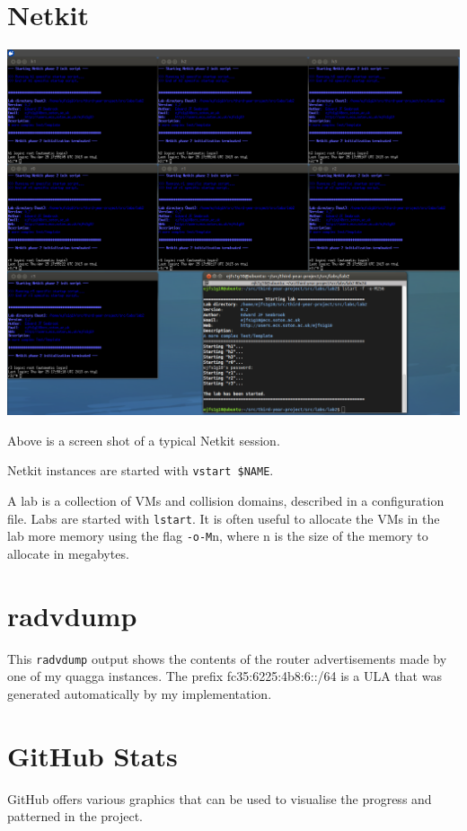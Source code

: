 \chapter{Netkit}
\begin{center}
	\includegraphics[width=\linewidth]{../Diagrams/Netkit/NetkitScreenshot.png}
\end{center}

Above is a screen shot of a typical Netkit session.  

Netkit instances are started with \texttt{vstart \$NAME}.

A lab is a collection of VMs and collision domains, described in a
configuration file. Labs are started with \texttt{lstart}. It is often useful
to allocate the VMs in the lab more memory using the flag \texttt{-o-M}n, where
n is the size of the memory to allocate in megabytes.

\chapter{radvdump}
\label{radvdump}
This \texttt{radvdump} output shows the contents of the router advertisements
made by one of my quagga instances. The prefix fc35:6225:4b8:6::/64 is a ULA
that was generated automatically by my implementation.



\chapter{GitHub Stats}
\label{GithubStats}
GitHub offers various graphics that can be used to visualise the progress and
patterned in the project. 

